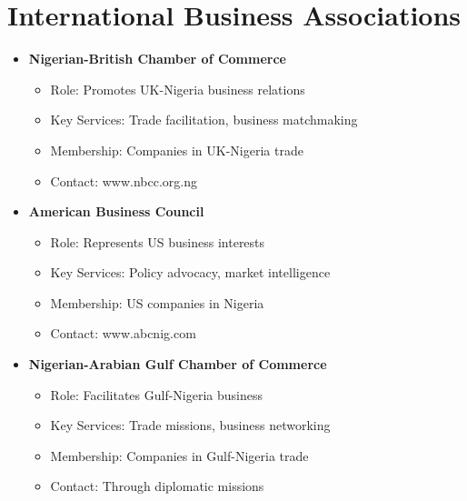 \section{International Business Associations}\label{sec:international-associations}
\vspace{1em}

\begin{tcolorbox}[
    colback=white,
    colframe=primarydark,
    title=\textbf{Bilateral Business Organizations},
    before skip=1em,
    after skip=1em
]
    \begin{itemize}[leftmargin=*,itemsep=0.5em]
        \item \textbf{Nigerian-British Chamber of Commerce}
        \begin{itemize}[itemsep=0.3em]
            \item Role: Promotes UK-Nigeria business relations
            \item Key Services: Trade facilitation, business matchmaking
            \item Membership: Companies in UK-Nigeria trade
            \item Contact: www.nbcc.org.ng
        \end{itemize}

        \vspace{0.5em}

        \item \textbf{American Business Council}
        \begin{itemize}[itemsep=0.3em]
            \item Role: Represents US business interests
            \item Key Services: Policy advocacy, market intelligence
            \item Membership: US companies in Nigeria
            \item Contact: www.abcnig.com
        \end{itemize}

        \vspace{0.5em}

        \item \textbf{Nigerian-Arabian Gulf Chamber of Commerce}
        \begin{itemize}[itemsep=0.3em]
            \item Role: Facilitates Gulf-Nigeria business
            \item Key Services: Trade missions, business networking
            \item Membership: Companies in Gulf-Nigeria trade
            \item Contact: Through diplomatic missions
        \end{itemize}
    \end{itemize}
\end{tcolorbox}

